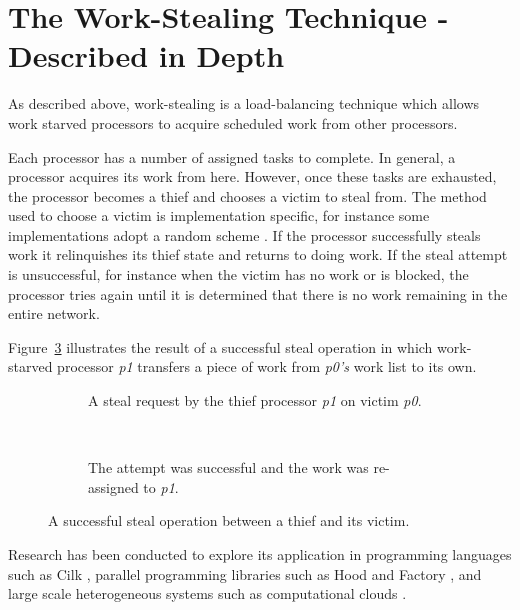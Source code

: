 \section{The Work-Stealing Technique - Described in Depth}

As described above, \gls{work-stealing} is a \gls{load-balancing} technique which allows work starved processors to acquire scheduled work from other processors. 

Each processor has a number of assigned tasks to complete. In general, a processor acquires its work from here.
However, once these tasks are exhausted, the processor becomes a \gls{thief} and chooses a \gls{victim} to steal from. 
The method used to choose a victim is implementation specific, for instance some implementations adopt a random scheme \cite{blumleis , jliff, narora}.
If the processor successfully steals work it relinquishes its thief state and returns to doing work.
If the steal attempt is unsuccessful, for instance when the victim has no work or is blocked, the processor tries again
until it is determined that there is no work remaining in the entire network. 

Figure~\ref{fig:stealoperation} illustrates the result of a successful steal operation in which work-starved processor \textit{p1} transfers a piece
of work from \textit{p0's} work list to its own. %

\begin{figure}[h]
\centering
\begin{subfigure}[b]{0.4\textwidth}
  \centering    
  
  \caption{
    \tiny A steal request by the thief processor \textit{p1} on victim \textit{p0}.
  }
  \label{fig:stealreq}
\end{subfigure}
~~~~~~ %
\begin{subfigure}[b]{0.4\textwidth}
  \centering
  
  \caption{
    \tiny The attempt was successful and the work was re-assigned to \textit{p1}.
  }
  \label{fig:stealsuccess}
\end{subfigure}
\caption{
    A successful steal operation between a thief and its victim.
  }
\label{fig:stealoperation}
\end{figure}

Research has been conducted to explore its application in programming languages such as Cilk \cite{blumleis}, 
parallel programming libraries such as Hood \cite{hoodlib} and Factory \cite{factorylib}, 
and large scale heterogeneous systems such as computational clouds \cite{scalesthesis}.


